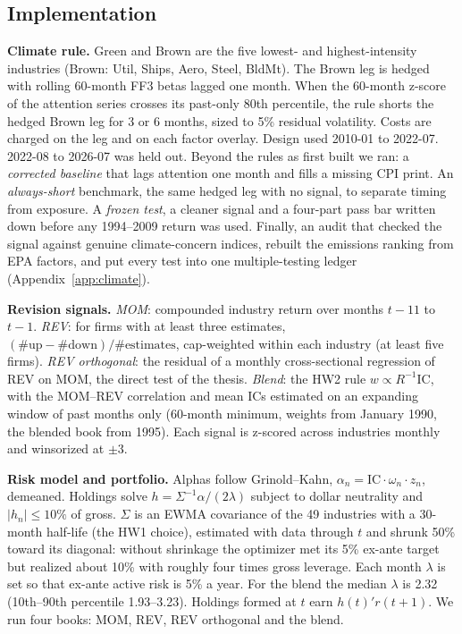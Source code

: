 \documentclass[11pt]{article}
\begin{document}
\subsection{Implementation}
\label{sec:impl}

\textbf{Climate rule.} Green and Brown are the five lowest- and highest-intensity industries (Brown: Util, Ships, Aero, Steel, BldMt). The Brown leg is hedged with rolling 60-month FF3 betas lagged one month. When the 60-month z-score of the attention series crosses its past-only 80th percentile, the rule shorts the hedged Brown leg for 3 or 6 months, sized to 5\% residual volatility. Costs are charged on the leg and on each factor overlay. Design used 2010-01 to 2022-07. 2022-08 to 2026-07 was held out. Beyond the rules as first built we ran: a \emph{corrected baseline} that lags attention one month and fills a missing CPI print. An \emph{always-short} benchmark, the same hedged leg with no signal, to separate timing from exposure. A \emph{frozen test}, a cleaner signal and a four-part pass bar written down before any 1994--2009 return was used. Finally, an audit that checked the signal against genuine climate-concern indices, rebuilt the emissions ranking from EPA factors, and put every test into one multiple-testing ledger (Appendix~\ref{app:climate}).

\textbf{Revision signals.} \emph{MOM}: compounded industry return over months $t-11$ to $t-1$. \emph{REV}: for firms with at least three estimates, $(\#\text{up}-\#\text{down})/\#\text{estimates}$, cap-weighted within each industry (at least five firms). \emph{REV orthogonal}: the residual of a monthly cross-sectional regression of REV on MOM, the direct test of the thesis. \emph{Blend}: the HW2 rule $w\propto R^{-1}\mathrm{IC}$, with the MOM--REV correlation and mean ICs estimated on an expanding window of past months only (60-month minimum, weights from January 1990, the blended book from 1995). Each signal is z-scored across industries monthly and winsorized at $\pm3$.

\textbf{Risk model and portfolio.} Alphas follow Grinold--Kahn, $\alpha_n=\mathrm{IC}\cdot\omega_n\cdot z_n$, demeaned. Holdings solve $h=\Sigma^{-1}\alpha/(2\lambda)$ subject to dollar neutrality and $|h_n|\leq 10\%$ of gross. $\Sigma$ is an EWMA covariance of the 49 industries with a 30-month half-life (the HW1 choice), estimated with data through $t$ and shrunk 50\% toward its diagonal: without shrinkage the optimizer met its 5\% ex-ante target but realized about 10\% with roughly four times gross leverage. Each month $\lambda$ is set so that ex-ante active risk is 5\% a year. For the blend the median $\lambda$ is 2.32 (10th--90th percentile 1.93--3.23). Holdings formed at $t$ earn $h(t)'r(t+1)$. We run four books: MOM, REV, REV orthogonal and the blend.
\end{document}
